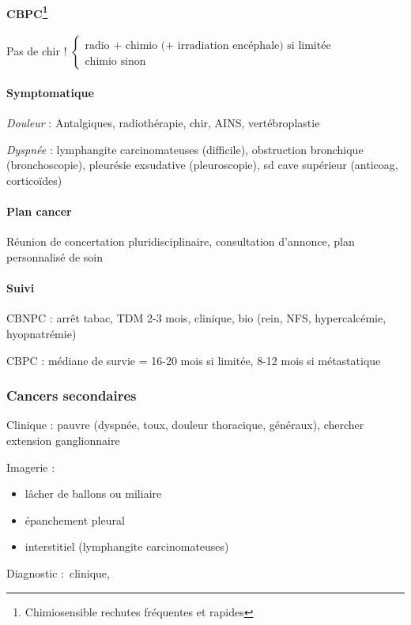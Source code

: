 \documentclass[11pt]{article}
\begin{document}
\paragraph{CBPC\footnote{Chimiosensible rechutes fréquentes et rapides}}
\label{sec:org86f3242}
Pas de chir !
$
\left \{
  \begin{array}{l}
    \text{radio + chimio (+ irradiation encéphale) si limitée}\\
    \text{chimio sinon}
  \end{array}
\right.
$
\paragraph{Symptomatique}
\label{sec:org84f83d1}
\emph{Douleur}  : Antalgiques, radiothérapie, chir, AINS, vertébroplastie

\emph{Dyspnée}  : lymphangite carcinomateuses (difficile), obstruction bronchique
(bronchoscopie), pleurésie exsudative (pleuroscopie), sd cave supérieur
(anticoag, corticoïdes)

\paragraph{Plan cancer}
\label{sec:orga506557}
Réunion de concertation pluridisciplinaire, consultation d'annonce, plan
personnalisé de soin
\paragraph{Suivi}
\label{sec:org9945618}
CBNPC : arrêt tabac, TDM 2-3 mois, clinique, bio (rein, NFS, hypercalcémie,
hyopnatrémie)

CBPC : médiane de survie = 16-20 mois si limitée, 8-12 mois si métastatique
\subsubsection{Cancers secondaires}
\label{sec:org98fe562}
Clinique : pauvre (dyspnée, toux, douleur thoracique, généraux), chercher extension ganglionnaire

Imagerie : 

\begin{itemize}
\item lâcher de ballons ou miliaire
\item épanchement pleural
\item interstitiel (lymphangite carcinomateuses)
\end{itemize}


Diagnostic : clinique, 
\end{document}

